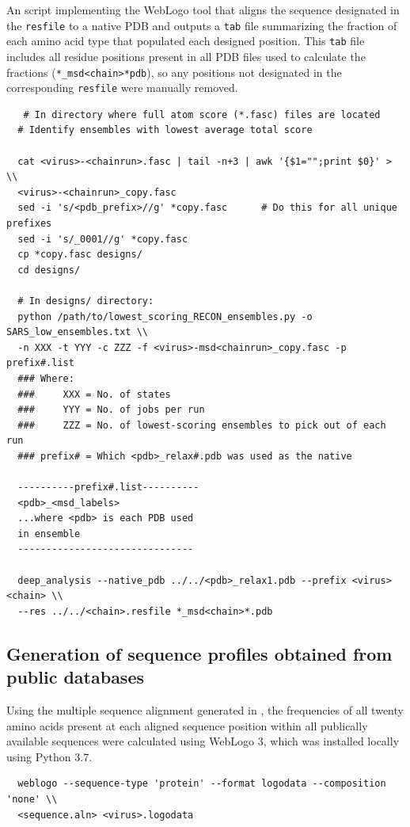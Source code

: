 \documentclass[10pt]{article}
\begin{document}
An script implementing the WebLogo tool that aligns the sequence designated in the \texttt{resfile} to a native PDB and outputs a \texttt{tab} file summarizing the fraction of each amino acid type that populated each designed position. This \texttt{tab} file includes all residue positions present in all PDB files used to calculate the fractions (\texttt{*\_msd<chain>*pdb}), so any positions not designated in the corresponding \texttt{resfile} were manually removed.

\begin{lstlisting}
   # In directory where full atom score (*.fasc) files are located
  # Identify ensembles with lowest average total score
  
  cat <virus>-<chainrun>.fasc | tail -n+3 | awk '{$1="";print $0}' > \\
  <virus>-<chainrun>_copy.fasc
  sed -i 's/<pdb_prefix>//g' *copy.fasc      # Do this for all unique prefixes
  sed -i 's/_0001//g' *copy.fasc
  cp *copy.fasc designs/
  cd designs/

  # In designs/ directory:
  python /path/to/lowest_scoring_RECON_ensembles.py -o SARS_low_ensembles.txt \\
  -n XXX -t YYY -c ZZZ -f <virus>-msd<chainrun>_copy.fasc -p prefix#.list
  ### Where:
  ###     XXX = No. of states
  ###     YYY = No. of jobs per run
  ###     ZZZ = No. of lowest-scoring ensembles to pick out of each run
  ### prefix# = Which <pdb>_relax#.pdb was used as the native
  
  ----------prefix#.list----------
  <pdb>_<msd_labels>
  ...where <pdb> is each PDB used
  in ensemble
  -------------------------------

  deep_analysis --native_pdb ../../<pdb>_relax1.pdb --prefix <virus><chain> \\
  --res ../../<chain>.resfile *_msd<chain>*.pdb
\end{lstlisting}

\subsection{Generation of sequence profiles obtained from public databases}

Using the multiple sequence alignment generated in , the frequencies of all twenty amino acids present at each aligned sequence position within all publically available sequences were calculated using WebLogo 3, which was installed locally using Python 3.7.

\begin{lstlisting} 
  weblogo --sequence-type 'protein' --format logodata --composition 'none' \\
  <sequence.aln> <virus>.logodata
\end{lstlisting}
\end{document}
